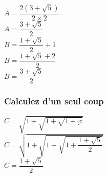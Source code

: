 $ A = \dfrac{2\left(3+\sqrt{5}\right)}{2\times 2} $ \\

$ A = \dfrac{3+\sqrt{5}}{2} $ \\

$ B = \dfrac{1 + \sqrt{5}}{2} + 1 $ \\

$ B = \dfrac{1 + \sqrt{5} + 2}{2} $ \\

$ B = \dfrac{3 + \sqrt{5}}{2} $ \\

\subsubsection{Calculez d'un seul coup}

$ C = \sqrt{1+\sqrt{1+\sqrt{1+\varphi}}} $ \\

$ C = \sqrt{1+\sqrt{1+\sqrt{1+\dfrac{1 + \sqrt{5}}{2}}}} $ \\

$ C = \dfrac{1 + \sqrt{5}}{2} $ \\


